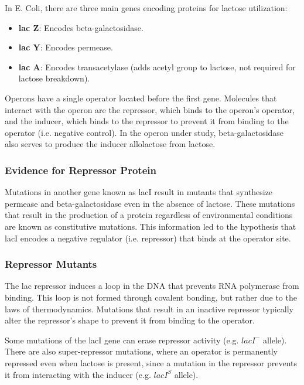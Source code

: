 \documentclass[12pt,titlepage]{article}
\begin{document}
        In E. Coli, there are three main genes encoding proteins for lactose utilization:
        \begin{itemize}
          \item \textbf{lac Z}: Encodes beta-galactosidase.
          \item \textbf{lac Y}: Encodes permease.
          \item \textbf{lac A}: Encodes transacetylase (adds acetyl group to lactose, not required for lactose breakdown).
        \end{itemize}

        Operons have a single operator located before the first gene. Molecules that interact with the operon are the repressor, which binds to the operon's operator,
        and the inducer, which binds to the repressor to prevent it from binding to the operator (i.e. negative control). In the operon under study,
        beta-galactosidase also serves to produce the inducer allolactose from lactose.

      \subsubsection{Evidence for Repressor Protein}
        Mutations in another gene known as lacI result in mutants that synthesize permease and beta-galactosidase even in the absence of lactose. These mutations
        that result in the production of a protein regardless of environmental conditions are known as constitutive mutations. This information led to the
        hypothesis that lacI encodes a negative regulator (i.e. repressor) that binds at the operator site.

      \subsubsection{Repressor Mutants}
        The lac repressor induces a loop in the DNA that prevents RNA polymerase from binding. This loop is not formed through covalent bonding, but rather due to
        the laws of thermodynamics. Mutations that result in an inactive repressor typically alter the repressor's shape to prevent it from binding to the operator.

        Some mutations of the lacI gene can erase repressor activity (e.g. $lacI^-$ allele). There are also super-repressor mutations, where an operator is
        permanently repressed even when lactose is present, since a mutation in the repressor prevents it from interacting with the inducer (e.g. $lacI^S$ allele).
\end{document}
